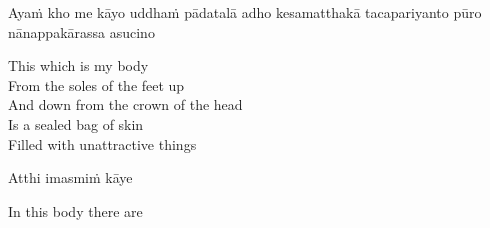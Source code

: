 \begin{leader}
\end{leader}

Ayaṁ kho me kāyo uddhaṁ pādatalā adho kesamatthakā tacapariyanto pūro nānappakārassa asucino

\begin{english}
  This which is my body\\
  From the soles of the feet up\\
  And down from the crown of the head\\
  Is a sealed bag of skin\\
  Filled with unattractive things
\end{english}

Atthi imasmiṁ kāye

\begin{english}
  In this body there are
\end{english}

